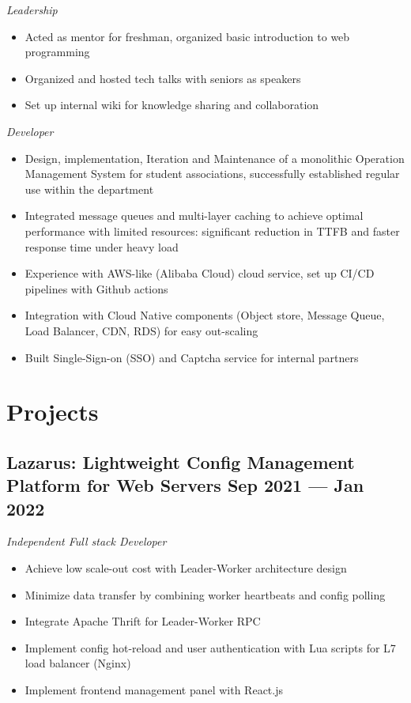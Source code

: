 \documentclass[a4,12pt]{article}
\newcommand{\subtext}[1]{
#1\par\vspace{-0.3cm}}
\newenvironment{zitemize}{
\begin{itemize}\itemsep0pt \parskip0pt \parsep1pt}
{\end{itemize}\vspace{-0.5cm}}
\begin{document}
\subtext{\textit{Leadership}}
\begin{zitemize}
    \item Acted as mentor for freshman, organized basic introduction to web programming
    \item Organized and hosted tech talks with seniors as speakers
    \item Set up internal wiki for knowledge sharing and collaboration
\end{zitemize}

\subtext{\textit{Developer}}
    \begin{zitemize}
        \item Design, implementation, Iteration and Maintenance of a monolithic Operation Management System for student associations, successfully established regular use within the department
        \item Integrated message queues and multi-layer caching to achieve optimal performance with limited resources: significant reduction in TTFB and faster response time under heavy load
        \item Experience with AWS-like (Alibaba Cloud) cloud service, set up CI/CD pipelines with Github actions
        \item Integration with Cloud Native components (Object store, Message Queue, Load Balancer, CDN, RDS) for easy out-scaling
        \item Built Single-Sign-on (SSO) and Captcha service for internal partners 
    \end{zitemize}

\section{\textbf{Projects}}

\subsection*{Lazarus: {\normalsize\normalfont Lightweight Config Management Platform for Web Servers} \hfill \textbf{Sep 2021 --- Jan 2022}}
\subtext{\textit{Independent Full stack Developer}}
\begin{zitemize}
    \item Achieve low scale-out cost with Leader-Worker architecture design
    \item Minimize data transfer by combining worker heartbeats and config polling
    \item Integrate Apache Thrift for Leader-Worker RPC
    \item Implement config hot-reload and user authentication with Lua scripts for L7 load balancer (Nginx)
    \item Implement frontend management panel with React.js
\end{zitemize}
\end{document}
